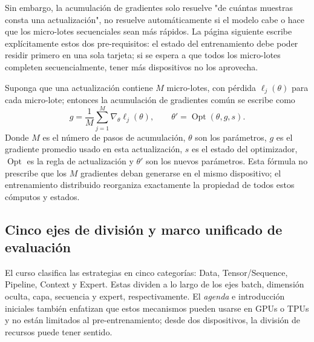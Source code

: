 

Sin embargo, la acumulación de gradientes solo resuelve "de cuántas muestras consta una actualización", no resuelve automáticamente si el modelo cabe o hace que los micro-lotes secuenciales sean más rápidos. La página siguiente escribe explícitamente estos dos pre-requisitos: el estado del entrenamiento debe poder residir primero en una sola tarjeta; si se espera a que todos los micro-lotes completen secuencialmente, tener más dispositivos no los aprovecha.


Suponga que una actualización contiene $M$ micro-lotes, con pérdida $\ell_j(\theta)$ para cada micro-lote; entonces la acumulación de gradientes común se escribe como
\[
g=\frac{1}{M}\sum_{j=1}^{M}\nabla_\theta \ell_j(\theta),
\qquad
\theta' = \operatorname{Opt}(\theta,g,s).
\]
Donde $M$ es el número de pasos de acumulación, $\theta$ son los parámetros, $g$ es el gradiente promedio usado en esta actualización, $s$ es el estado del optimizador, $\operatorname{Opt}$ es la regla de actualización y $\theta'$ son los nuevos parámetros. Esta fórmula no prescribe que los $M$ gradientes deban generarse en el mismo dispositivo; el entrenamiento distribuido reorganiza exactamente la propiedad de todos estos cómputos y estados.

\subsection{Cinco ejes de división y marco unificado de evaluación}

El curso clasifica las estrategias en cinco categorías: Data, Tensor/Sequence, Pipeline, Context y Expert. Estas dividen a lo largo de los ejes batch, dimensión oculta, capa, secuencia y expert, respectivamente. El \textit{agenda} e introducción iniciales también enfatizan que estos mecanismos pueden usarse en GPUs o TPUs y no están limitados al pre-entrenamiento; desde dos dispositivos, la división de recursos puede tener sentido.


